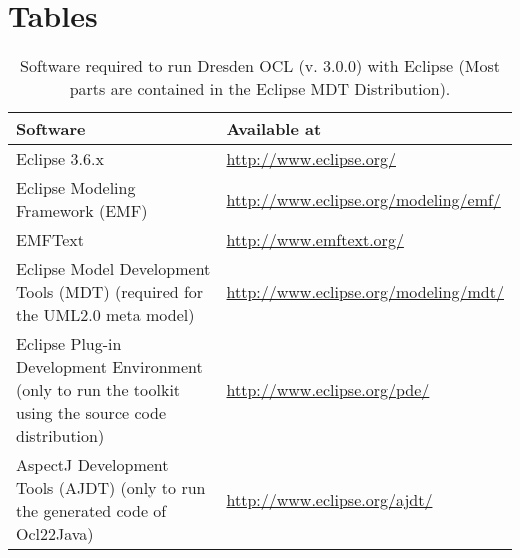 \cleardoublepage
{}
{}
\chapter*{Tables}

\begin{table}[h]
\begin{tabular}{|p{7cm}|p{7cm}|}
    \hline
    \textbf{Software} & \textbf{Available at} \\
    \hline
    Eclipse 3.6.x & \url{http://www.eclipse.org/} \\
    \hline
    Eclipse Modeling Framework (EMF) & \url{http://www.eclipse.org/modeling/emf/} \\
    \hline
    EMFText & \url{http://www.emftext.org/} \\
    \hline
    Eclipse Model Development Tools (MDT) 
    \newline\footnotesize(required for the UML2.0 meta model) &
    \url{http://www.eclipse.org/modeling/mdt/} \\
    \hline
    Eclipse Plug-in Development Environment 
    \newline\footnotesize(only to run the toolkit using the source code
    distribution) & \url{http://www.eclipse.org/pde/} \\
    \hline
    AspectJ Development Tools (AJDT) 
    \newline\footnotesize(only to run the generated code of Ocl22Java) &
    \url{http://www.eclipse.org/ajdt/} \\
    \hline
\end{tabular}
\caption{Software required to run Dresden OCL (v. 3.0.0) with Eclipse \newline(Most parts are con\-tained in the Eclipse MDT Distribution).}
\label{tab:software}
\end{table}


